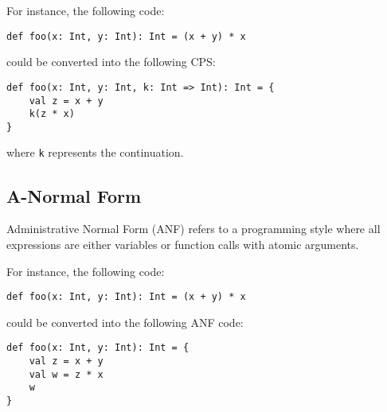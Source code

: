 For instance, the following code:

\begin{verbatim}
def foo(x: Int, y: Int): Int = (x + y) * x
\end{verbatim}

\noindent could be converted into the following CPS:

\begin{verbatim}
def foo(x: Int, y: Int, k: Int => Int): Int = {
    val z = x + y
    k(z * x)
}
\end{verbatim}

\noindent where \texttt{k} represents the continuation.

\subsection{A-Normal Form}

Administrative Normal Form (ANF) refers to a programming style where all expressions are either
variables or function calls with atomic arguments.

For instance, the following code:

\begin{verbatim}
def foo(x: Int, y: Int): Int = (x + y) * x
\end{verbatim}

\noindent could be converted into the following ANF code:

\begin{verbatim}
def foo(x: Int, y: Int): Int = {
    val z = x + y
    val w = z * x
    w
}
\end{verbatim}
